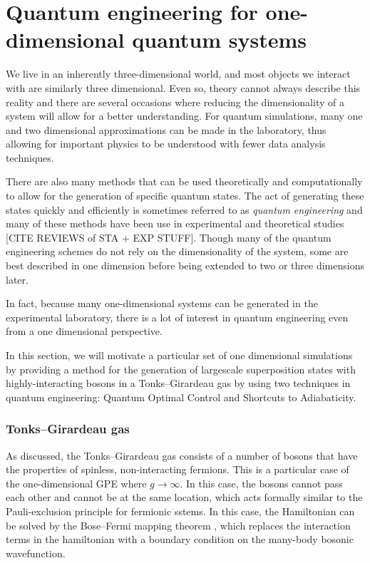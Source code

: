 \chapter{Quantum engineering for one-dimensional quantum systems}
\label{ch:1d}

We live in an inherently three-dimensional world, and most objects we interact with are similarly three dimensional.
Even so, theory cannot always describe this reality and there are several occasions where reducing the dimensionality of a system will allow for a better understanding.
For quantum simulations, many one and two dimensional approximations can be made in the laboratory, thus allowing for important physics to be understood with fewer data analysis techniques.

There are also many methods that can be used theoretically and computationally to allow for the generation of specific quantum states.
The act of generating these states quickly and efficiently is sometimes referred to as \textit{quantum engineering} and many of these methods have been use in experimental and theoretical studies [CITE REVIEWS of STA + EXP STUFF].
Though many of the quantum engineering schemes do not rely on the dimensionality of the system, some are best described in one dimension before being extended to two or three dimensions later.

In fact, because many one-dimensional systems can be generated in the experimental laboratory, there is a lot of interest in quantum engineering even from a one dimensional perspective.

In this section, we will motivate a particular set of one dimensional simulations by providing a method for the generation of largescale superposition states with highly-interacting bosons in a Tonks--Girardeau gas by using two techniques in quantum engineering: Quantum Optimal Control and Shortcuts to Adiabaticity.

\subsection{Tonks--Girardeau gas}

As discussed, the Tonks--Girardeau gas consists of a number of bosons that have the properties of spinless, non-interacting fermions.
This is a particular case of the one-dimensional GPE where $g\rightarrow\infty$.
In this case, the bosons cannot pass each other and cannot be at the same location, which acts formally similar to the Pauli-exclusion principle for fermionic sstems.
In this case, the Hamiltonian can be solved by the Bose--Fermi mapping theorem \cite{girardeau2001ground, girardeau2001measurement}, which replaces the interaction terms in the hamiltonian with a boundary condition on the many-body bosonic wavefunction.

